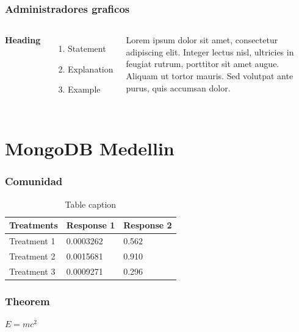 \documentclass{beamer}
\begin{document}
\begin{frame}
\frametitle{Administradores graficos}
\begin{columns}[c] %

\textbf{Heading}
\begin{enumerate}
\item Statement
\item Explanation
\item Example
\end{enumerate}

Lorem ipsum dolor sit amet, consectetur adipiscing elit. Integer lectus nisl, ultricies in feugiat rutrum, porttitor sit amet augue. Aliquam ut tortor mauris. Sed volutpat ante purus, quis accumsan dolor.

\end{columns}
\end{frame}


\section{MongoDB Medellin}

\begin{frame}
\frametitle{Comunidad}
\begin{table}
\begin{tabular}{l l l}
\toprule
\textbf{Treatments} & \textbf{Response 1} & \textbf{Response 2}\\
\midrule
Treatment 1 & 0.0003262 & 0.562 \\
Treatment 2 & 0.0015681 & 0.910 \\
Treatment 3 & 0.0009271 & 0.296 \\
\bottomrule
\end{tabular}
\caption{Table caption}
\end{table}
\end{frame}

\begin{frame}
\frametitle{Theorem}
\begin{theorem}
$E = mc^2$
\end{theorem}
\end{frame}
\end{document}
